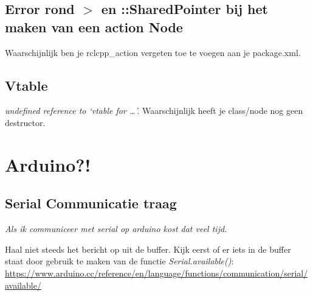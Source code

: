 \subsection{Error rond $>$ en ::SharedPointer bij het maken van een action Node}
Waarschijnlijk ben je rclcpp\_action vergeten toe te voegen aan je package.xml.

\subsection{Vtable}
\textit{undefined reference to `vtable for \dots'.}
Waarschijnlijk heeft je class/node nog geen destructor.

\section{Arduino?!}

\subsection{Serial Communicatie traag }
\textit{Als ik communiceer met serial op arduino kost dat veel tijd.}

Haal niet steeds het bericht op uit de buffer. Kijk eerst of er iets in de buffer staat door gebruik te maken van de functie \textit{Serial.available()}: \url{https://www.arduino.cc/reference/en/language/functions/communication/serial/available/}

